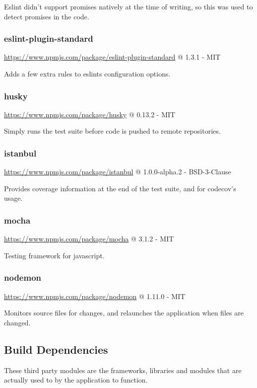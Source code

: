 Eslint didn't support promises natively at the time of writing, so this was used to detect promises in the code.

\subsubsection*{eslint-plugin-standard} 

\url{https://www.npmjs.com/package/eslint-plugin-standard} @ 1.3.1 - MIT

Adds a few extra rules to eslints configuration options.

\subsubsection*{husky} 

\url{https://www.npmjs.com/package/husky} @ 0.13.2 - MIT

Simply runs the test suite before code is pushed to remote repositories.

\subsubsection*{istanbul} 

\url{https://www.npmjs.com/package/istanbul} @ 1.0.0-alpha.2 - BSD-3-Clause

Provides coverage information at the end of the test suite, and for codecov's usage.

\subsubsection*{mocha} 

\url{https://www.npmjs.com/package/mocha} @ 3.1.2 - MIT

Testing framework for javascript.

\subsubsection*{nodemon} 

\url{https://www.npmjs.com/package/nodemon} @ 1.11.0 - MIT

Monitors source files for changes, and relaunches the application when files are changed.

\subsection{Build Dependencies}
These third party modules are the frameworks, libraries and modules that are actually used to by the application to function. 

